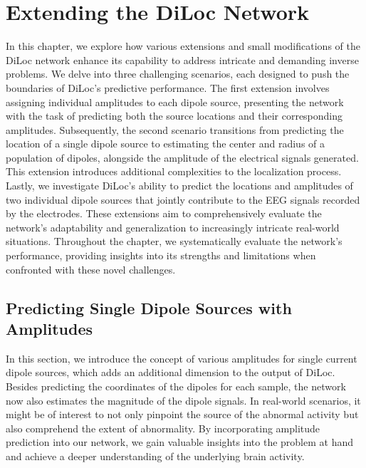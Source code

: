 \documentclass[a4paper, UKenglish, 11pt]{uiomaster}
\begin{document}
\chapter{Extending the DiLoc Network}
In this chapter, we explore how various extensions and small modifications of the DiLoc network enhance its capability to address intricate and demanding inverse problems. We delve into three challenging scenarios, each designed to push the boundaries of DiLoc's predictive performance. The first extension involves assigning individual amplitudes to each dipole source, presenting the network with the task of predicting both the source locations and their corresponding amplitudes. Subsequently, the second scenario transitions from predicting the location of a single dipole source to estimating the center and radius of a population of dipoles, alongside the amplitude of the electrical signals generated. This extension introduces additional complexities to the localization process. Lastly, we investigate DiLoc's ability to predict the locations and amplitudes of two individual dipole sources that jointly contribute to the EEG signals recorded by the electrodes. These extensions aim to comprehensively evaluate the network's adaptability and generalization to increasingly intricate real-world situations. Throughout the chapter, we systematically evaluate the network's performance, providing insights into its strengths and limitations when confronted with these novel challenges.

\section{Predicting Single Dipole Sources with Amplitudes}

In this section, we introduce the concept of various amplitudes for single current dipole sources, which adds an additional dimension to the output of DiLoc. Besides predicting the coordinates of the dipoles for each sample, the network now also estimates the magnitude of the dipole signals. In real-world scenarios, it might be of interest to not only pinpoint the source of the abnormal activity but also comprehend the extent of abnormality. By incorporating amplitude prediction into our network, we gain valuable insights into the problem at hand and achieve a deeper understanding of the underlying brain activity.

\end{document}
